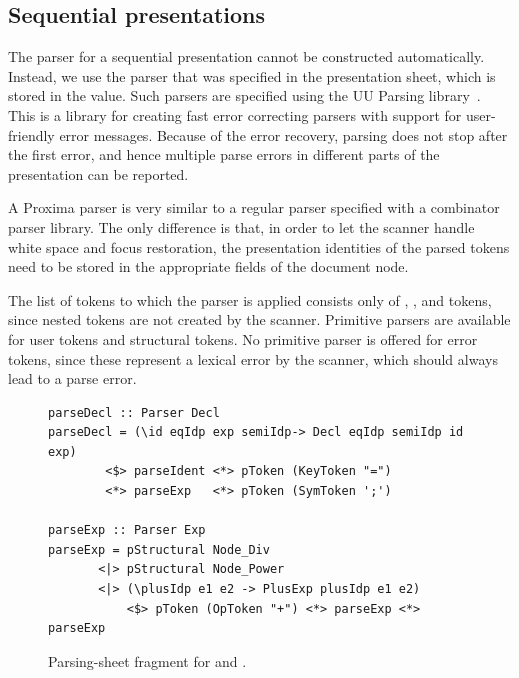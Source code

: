\documentclass{article}[10pt]
\begin{document}



\subsection{Sequential presentations}

The parser for a sequential presentation cannot be constructed automatically. Instead, we use the parser that was specified in the presentation sheet, which is stored in the  value. Such parsers are specified using the UU Parsing library~\cite{swierstra03polishParsers, swierstra08parserCombinators}. This is a library for creating fast error correcting parsers with support for user-friendly error messages. Because of the error recovery, parsing does not stop after the first error, and hence multiple parse errors in different parts of the presentation can be reported. 

A Proxima parser is very similar to a regular parser specified with a combinator parser library. The only difference is that, in order to let the scanner handle white space and focus restoration, the presentation identities of the parsed tokens need to be stored in the appropriate fields of the document node. 

The list of tokens to which the parser is applied consists only of , , and  tokens, since nested  tokens are not created by the scanner. Primitive parsers are available for user tokens and structural tokens. No primitive parser is offered for error tokens, since these represent a lexical error by the scanner, which should always lead to a parse error.



\begin{figure}
\begin{center}
\begin{footnotesize}
\begin{verbatim}
parseDecl :: Parser Decl
parseDecl = (\id eqIdp exp semiIdp-> Decl eqIdp semiIdp id exp)
        <$> parseIdent <*> pToken (KeyToken "=") 
        <*> parseExp   <*> pToken (SymToken ';')
       
parseExp :: Parser Exp
parseExp = pStructural Node_Div
       <|> pStructural Node_Power
       <|> (\plusIdp e1 e2 -> PlusExp plusIdp e1 e2)
           <$> pToken (OpToken "+") <*> parseExp <*> parseExp
\end{verbatim}
\end{footnotesize}
\end{center}
\caption{Parsing-sheet fragment for  and .} \label{fig:parser} 
\end{figure}
\end{document}
